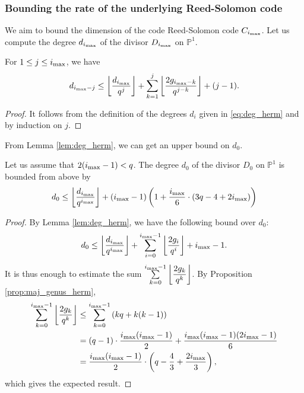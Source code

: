 \documentclass[a4paper,USenglish,autoref]{lipics-v2021}
\newcommand{\cd}{\cdot}
\newcommand{\ii}{i_{\rm{max}}}
\begin{document}
\subsubsection{Bounding the rate of the underlying Reed-Solomon code}

We aim to bound the dimension of the code Reed-Solomon code $C_{\ii}$. Let us compute the degree $d_{\ii}$ of the divisor $D_{\ii}$ on $\mathbb{P}^1$.

\begin{lemma}\label{lem:deg_herm}
	For $1 \leq j \leq \ii$, we have 
	\[d_{\ii -j} \leq \left\lfloor \dfrac{d_{\ii}}{q^j}\right\rfloor + \sum\limits_{k=1}^j \left\lfloor \dfrac{2g_{\ii -k}}{q^{j-k}}\right\rfloor + (j-1).\] 
\end{lemma}

\begin{proof}
	It follows from the definition of the degrees $d_i$ given in \eqref{eq:deg_herm} and by induction on $j$.
\end{proof}

From Lemma \ref{lem:deg_herm}, we can get an upper bound on $d_0$.

\begin{corollary}
	Let us assume that $2(\ii-1) < q$.
	The degree $d_0$ of the divisor $D_0$ on $\mathbb{P}^1$ is bounded from above by 
	\[d_0 \leq \left\lfloor \dfrac{d_{\ii}}{q^{\ii}}\right\rfloor + (\ii-1)\left( 1+\frac{\ii}{6} \cd \left(3q-4 + 2\ii\right) \right) \]
\end{corollary}

\begin{proof}
	By Lemma \ref{lem:deg_herm}, we have the following bound over $d_0$:
	\[d_0 \leq \left\lfloor \dfrac{d_{\ii}}{q^{\ii}}\right\rfloor + \sum\limits_{i=0}^{\ii-1} \left\lfloor \dfrac{2g_i}{q^{i}}\right\rfloor + \ii-1.\]
	It is thus enough to estimate the sum $\sum\limits_{k=0}^{\ii-1} \left\lfloor \dfrac{2g_k}{q^k}\right\rfloor$. By Proposition \ref{prop:maj_genus_herm},
	\begin{align*}
		\sum\limits_{k=0}^{\ii-1} \left\lfloor \dfrac{2g_k}{q^k}\right\rfloor & \leq  \sum\limits_{k=0}^{\ii-1} \left(kq + k(k-1)\right)  \\
		&= (q-1) \cd \dfrac{\ii(\ii-1)}{2} + \dfrac{\ii(\ii-1)(2\ii-1)}{6} \\
		&= \dfrac{\ii(\ii-1)}{2}\cd \left(q-\frac{4}{3} + \frac{2\ii}{3}\right),
	\end{align*}
	which gives the expected result.
\end{proof}
\end{document}
